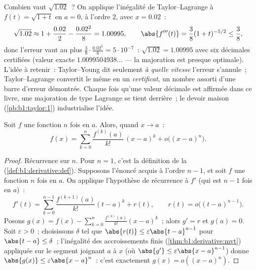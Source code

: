 \begin{example}\label{ex:b1:taylor:certified}
Combien vaut $\sqrt{1.02}$~? On applique l'inégalité de
Taylor--Lagrange à $f(t) = \sqrt{1 + t}$ en $a = 0$, à l'ordre $2$,
avec $x = 0.02$~:
\[
\sqrt{1.02} \approx 1 + \frac{0.02}{2} - \frac{0.02^2}{8}
= 1.00995 ,
\qquad
\abs{f'''(t)} = \frac{3}{8}(1+t)^{-5/2} \leq \frac 38 ,
\]
donc l'erreur vaut au plus $\frac38 \cdot \frac{0.02^3}{6} =
5\cdot10^{-7}$~: $\sqrt{1.02} = 1.00995$ avec six décimales
certifiées (valeur exacte $1.0099504938\dots$ --- la majoration est
presque optimale). L'idée à retenir~: Taylor--Young dit seulement
\emph{à quelle vitesse} l'erreur s'annule~; Taylor--Lagrange
convertit le même  en un \emph{certificat}, un nombre
assorti d'une barre d'erreur démontrée. Chaque fois qu'une valeur
décimale est affirmée dans ce livre, une majoration de type Lagrange
se tient derrière~; le devoir maison (\cref{pb:b1:taylor:1})
industrialise l'idée.
\end{example}

\begin{theorem}\label{thm:b1:taylor:young}
Soit $f$ une fonction $n$ fois  en $a$. Alors, quand $x \to a$~:
\[
f(x) = \sum_{k=0}^{n} \frac{f^{(k)}(a)}{k!}\,(x-a)^k
+ o\bigl((x-a)^n\bigr) .
\]
\end{theorem}

\begin{proof}
Récurrence sur $n$. Pour $n = 1$, c'est la définition de la 
(\cref{def:b1:derivative:def}). Supposons l'énoncé acquis à l'ordre
$n - 1$, et soit $f$ une fonction $n$ fois  en $a$. On applique
l'hypothèse de récurrence à $f'$ (qui est $n-1$ fois 
en $a$)~:
\[
f'(t) = \sum_{k=0}^{n-1} \frac{f^{(k+1)}(a)}{k!}(t-a)^k + r(t),
\qquad r(t) = o\bigl((t-a)^{n-1}\bigr).
\]
Posons $g(x) = f(x) - \sum_{k=0}^{n} \frac{f^{(k)}(a)}{k!}(x-a)^k$~;
alors $g' = r$ et $g(a) = 0$. Soit $\varepsilon > 0$~; choisissons
$\delta$ tel que $\abs{r(t)} \leq \varepsilon\abs{t - a}^{n-1}$ pour
$\abs{t-a} \leq \delta$~; l'inégalité des accroissements finis
(\cref{thm:b1:derivative:mvt}) appliquée sur le segment joignant $a$ à
$x$ (où $\abs{g'} \leq \varepsilon\abs{x-a}^{n-1}$) donne
$\abs{g(x)} \leq \varepsilon\abs{x - a}^n$~: c'est exactement $g(x) =
o((x-a)^n)$.
\end{proof}

